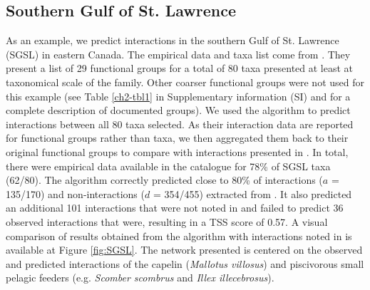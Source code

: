     \subsection{Southern Gulf of St. Lawrence}
As an example, we predict interactions in the southern Gulf of St. Lawrence (SGSL) in eastern Canada. The empirical data and taxa list come from \citet{savenkoff2004}. They present a list of 29 functional groups for a total of 80 taxa presented at least at taxonomical scale of the family. Other coarser functional groups were not used for this example (see Table \ref{ch2-tbl1} in Supplementary information (SI) and \citet{savenkoff2004} for a complete description of documented groups).
We used the algorithm to predict interactions between all 80 taxa selected. As their interaction data are reported for functional groups rather than taxa, we then aggregated them back to their original functional groups to compare with interactions presented in \citet{savenkoff2004}. In total, there were empirical data available in the catalogue for 78\% of SGSL taxa (62/80). The algorithm correctly predicted close to 80\% of interactions ($a$ = 135/170) and non-interactions ($d$ = 354/455) extracted from \citet{savenkoff2004}. It also predicted an additional 101 interactions that were not noted in \citet{savenkoff2004} and failed to predict 36 observed interactions that were, resulting in a TSS score of 0.57. A visual comparison of results obtained from the algorithm with interactions noted in \citet{savenkoff2004} is available at Figure \ref{fig:SGSL}. The network presented is centered on the observed and predicted interactions of the capelin (\textit{Mallotus villosus}) and piscivorous small pelagic feeders (e.g. \textit{Scomber scombrus} and \textit{Illex illecebrosus}).



